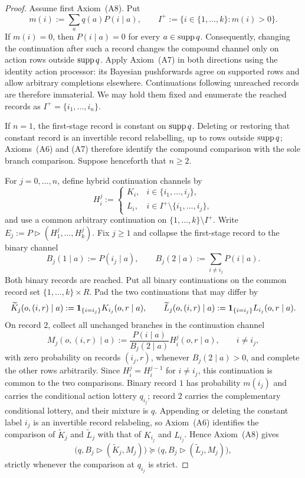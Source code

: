 \begin{proof}
Assume first Axiom~\textup{(A8)}.  Put
\[
 m(i):=\sum_aq(a)P(i\mid a),
 \qquad
 I^+:=\{i\in\{1,\ldots,k\}:m(i)>0\}.
\]
If $m(i)=0$, then $P(i\mid a)=0$ for every $a\in\operatorname{supp} q$.  Consequently, changing the continuation after such a
record changes the compound channel only on action rows outside $\operatorname{supp} q$.  Apply Axiom~\textup{(A7)} in both
directions using the identity action processor: its Bayesian pushforwards agree on supported rows and allow
arbitrary completions elsewhere.  Continuations following unreached records are therefore immaterial.  We may
hold them fixed and enumerate the reached records as $I^+=\{i_1,\ldots,i_n\}$.

If $n=1$, the first-stage record is constant on $\operatorname{supp} q$.  Deleting or restoring that constant record is an
invertible record relabelling, up to rows outside $\operatorname{supp} q$; Axioms~\textup{(A6)} and \textup{(A7)} therefore
identify the compound comparison with the sole branch comparison.  Suppose henceforth that $n\ge2$.

For $j=0,\ldots,n$, define hybrid continuation channels by
\[
 H_i^j:=
 \begin{cases}
 K_i,&i\in\{i_1,\ldots,i_j\},\\
 L_i,&i\in I^+\setminus\{i_1,\ldots,i_j\},
 \end{cases}
\]
and use a common arbitrary continuation on $\{1,\ldots,k\}\setminus I^+$.  Write
$E_j:=P\triangleright(H_1^j,\ldots,H_k^j)$.  Fix $j\ge1$ and collapse the first-stage record to the binary channel
\[
 B_j(1\mid a):=P(i_j\mid a),
 \qquad
 B_j(2\mid a):=\sum_{i\ne i_j}P(i\mid a).
\]
Both binary records are reached.  Put all binary continuations on the common record set
$\{1,\ldots,k\}\times R$.  Pad the
two continuations that may differ by
\[
 \widetilde K_j(o,(i,r)\mid a):=\mathbf 1_{\{i=i_j\}}K_{i_j}(o,r\mid a),
 \qquad
 \widetilde L_j(o,(i,r)\mid a):=\mathbf 1_{\{i=i_j\}}L_{i_j}(o,r\mid a).
\]
On record $2$, collect all unchanged branches in the continuation channel
\begin{equation}
 M_j(o,(i,r)\mid a)
 :=\frac{P(i\mid a)}{B_j(2\mid a)}H_i^j(o,r\mid a),
 \qquad i\ne i_j,
 \label{pt:eq:complement-continuation}
\end{equation}
with zero probability on records $(i_j,r)$, whenever $B_j(2\mid a)>0$, and complete the other rows arbitrarily.
Since $H_i^j=H_i^{j-1}$ for $i\ne i_j$, this continuation is common to the two comparisons.
Binary record $1$ has probability
$m(i_j)$ and carries the conditional action lottery $q_{i_j}$; record $2$ carries the complementary conditional
lottery, and their mixture is $q$.  Appending or deleting the constant label $i_j$ is an invertible record
relabeling, so Axiom~\textup{(A6)} identifies the comparison of $\widetilde K_j$ and $\widetilde L_j$ with that of
$K_{i_j}$ and $L_{i_j}$.  Hence Axiom~\textup{(A8)} gives
\[
 \bigl(q,B_j\triangleright(\widetilde K_j,M_j)\bigr)
 \succeq
 \bigl(q,B_j\triangleright(\widetilde L_j,M_j)\bigr),
\]
strictly whenever the comparison at $q_{i_j}$ is strict.


\end{proof}
